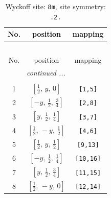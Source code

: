 \documentclass[fleqn,8pt]{jsarticle}
\begin{document}
\begin{longtable}{ccc}
\caption{Wyckoff site: {\tt 8m}, site symmetry: {\tt .2.}}
 \\
 \hline \hline
No. & position & mapping \\ \hline \endfirsthead

\multicolumn{2}{l}{\tablename\ \thetable{}} \\
 \hline \hline
No. & position & mapping \\ \hline \endhead

 \hline \hline
\multicolumn{2}{r}{\footnotesize\it continued ...} \\ \endfoot

 \hline \hline
\multicolumn{2}{r}{} \\ \endlastfoot

1 & $\left[ \frac{1}{2},\, y,\, 0 \right]$ & {\tt [1,5]} \\ \hline
2 & $\left[ - y,\, \frac{1}{2},\, \frac{3}{4} \right]$ & {\tt [2,8]} \\ \hline
3 & $\left[ y,\, \frac{1}{2},\, \frac{1}{4} \right]$ & {\tt [3,7]} \\ \hline
4 & $\left[ \frac{1}{2},\, - y,\, \frac{1}{2} \right]$ & {\tt [4,6]} \\ \hline
5 & $\left[ \frac{1}{2},\, y,\, \frac{1}{2} \right]$ & {\tt [9,13]} \\ \hline
6 & $\left[ - y,\, \frac{1}{2},\, \frac{1}{4} \right]$ & {\tt [10,16]} \\ \hline
7 & $\left[ y,\, \frac{1}{2},\, \frac{3}{4} \right]$ & {\tt [11,15]} \\ \hline
8 & $\left[ \frac{1}{2},\, - y,\, 0 \right]$ & {\tt [12,14]} \\
\end{longtable}
\renewcommand{\arraystretch}{1.2}
\end{document}
